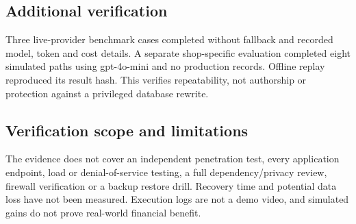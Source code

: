 \documentclass[10pt,a4paper]{article}
\begin{document}
\subsection*{Additional verification}

Three live-provider benchmark cases completed without fallback and recorded model, token and cost details. A separate shop-specific evaluation completed eight simulated paths using gpt-4o-mini and no production records. Offline replay reproduced its result hash. This verifies repeatability, not authorship or protection against a privileged database rewrite.


\subsection*{Verification scope and limitations}

The evidence does not cover an independent penetration test, every application endpoint, load or denial-of-service testing, a full dependency/privacy review, firewall verification or a backup restore drill. Recovery time and potential data loss have not been measured. Execution logs are not a demo video, and simulated gains do not prove real-world financial benefit.



\clearpage

\end{document}
